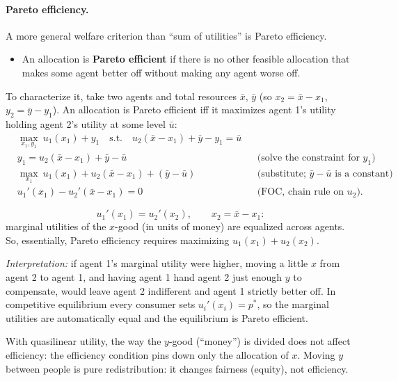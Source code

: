 \paragraph{Pareto efficiency.} A more general welfare criterion than ``sum of utilities'' is Pareto efficiency.
\begin{itemize}
\item An allocation is \textbf{Pareto efficient} if there is no other feasible allocation that makes some agent better off without making any agent worse off.
\end{itemize}
To characterize it, take two agents and total resources $\bar x$, $\bar y$ (so $x_2=\bar x-x_1$, $y_2=\bar y-y_1$). An allocation is Pareto efficient iff it maximizes agent 1's utility holding agent 2's utility at some level $\bar u$:
\begin{align*}
&\max_{x_1,y_1}\ u_1(x_1)+y_1\quad\text{s.t.}\quad u_2(\bar x-x_1)+\bar y-y_1=\bar u\\
&y_1=u_2(\bar x-x_1)+\bar y-\bar u &&\text{(solve the constraint for $y_1$)}\\
&\max_{x_1}\ u_1(x_1)+u_2(\bar x-x_1)+(\bar y-\bar u) &&\text{(substitute; $\bar y-\bar u$ is a constant)}\\
&u_1'(x_1)-u_2'(\bar x-x_1)=0 &&\text{(FOC, chain rule on $u_2$)}.
\end{align*}
\begin{keybox}[title=Necessary condition for Pareto efficiency (quasilinear case)]
\[
u_1'(x_1)=u_2'(x_2),\qquad x_2=\bar x-x_1:
\]
marginal utilities of the $x$-good (in units of money) are equalized across agents. So, essentially, Pareto efficiency requires maximizing $u_1(x_1)+u_2(x_2)$.
\end{keybox}
\emph{Interpretation:} if agent 1's marginal utility were higher, moving a little $x$ from agent 2 to agent 1, and having agent 1 hand agent 2 just enough $y$ to compensate, would leave agent 2 indifferent and agent 1 strictly better off. In competitive equilibrium every consumer sets $u_i'(x_i)=p^*$, so the marginal utilities are automatically equal and the equilibrium is Pareto efficient.

\begin{tipbox}
With quasilinear utility, the way the $y$-good (``money'') is divided does not affect efficiency: the efficiency condition pins down only the allocation of $x$. Moving $y$ between people is pure redistribution: it changes fairness (equity), not efficiency.
\end{tipbox}

